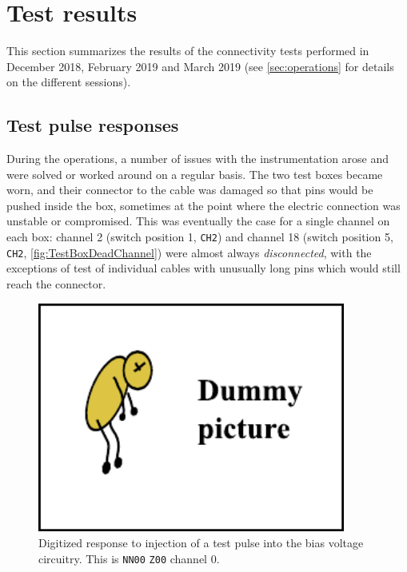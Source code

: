 \section{Test results}
\label{sec:results}


This section summarizes the results of the connectivity tests performed in
December 2018, February 2019 and March 2019 (see \cref{sec:operations} for
details on the different sessions).


\subsection{Test pulse responses}
\label{ssec:responses}


During the operations, a number of issues with the instrumentation arose and
were solved or worked around on a regular basis.
The two test boxes became worn, and their connector to the cable was damaged so
that pins would be pushed inside the box, sometimes at the point where the
electric connection was unstable or compromised. This was eventually the case
for a single channel on each box: channel 2 (switch position 1, \texttt{CH2})
and channel 18 (switch position 5, \texttt{CH2}, \cref{fig:TestBoxDeadChannel})
were almost always \emph{disconnected}, with the exceptions of test of
individual cables with unusually long pins which would still reach the 
connector.

\begin{figure}
  \centering
    \includegraphics[width=0.9\textwidth]{fig/dummy}
  \caption{
    Digitized response to injection of a test pulse into the bias voltage circuitry.
    This is \texttt{NN00} \texttt{Z00} channel 0.
    \label{fig:BiasVoltageResponse}
  }
\end{figure}

